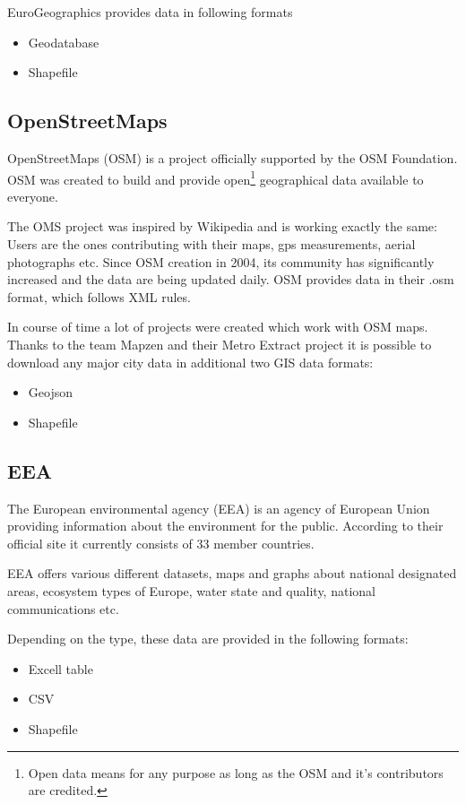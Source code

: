 \documentclass[thesis=M,english]{FITthesis}[2012/10/20]
\begin{document}
EuroGeographics provides data in following formats

\begin{itemize}
\item Geodatabase
\item Shapefile
\end{itemize}


\subsection{OpenStreetMaps}
OpenStreetMaps (OSM) is a project officially supported by the OSM Foundation.
OSM was created to build and provide open\footnote{Open data means for any purpose as long as the OSM and it's contributors are credited.} geographical data available to everyone.  

The OMS project was inspired by Wikipedia and is working exactly the same: Users are the ones contributing with their maps, gps measurements, aerial photographs etc. Since OSM creation in 2004, its community has significantly increased and the data are being updated daily.
OSM provides data in their .osm format, which follows XML rules.

In course of time a lot of projects were created which work with OSM maps.
Thanks to the team Mapzen and their Metro Extract project it is possible to download any major city data in additional two GIS data formats:
\begin{itemize}
\item Geojson
\item Shapefile
\end{itemize}

\subsection{EEA}
The European environmental agency (EEA) is an agency of European Union providing information about the environment for the public. According to their official site \cite{EEA16} it currently consists of 33 member countries.

EEA offers various different datasets, maps and graphs about national designated areas, ecosystem types of Europe, water state and quality, national communications etc. 

Depending on the type, these data are provided in the following formats:
\begin{itemize}
\item Excell table
\item CSV
\item Shapefile
\end{itemize} 
\end{document}
